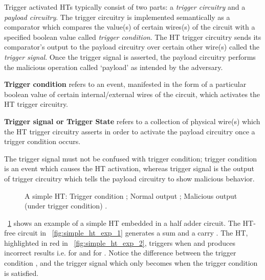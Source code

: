 \documentclass[10pt,journal,compsoc]{IEEEtran}
\begin{document}
Trigger activated HTs typically consist of two parts: a \textit{trigger circuitry} and a \textit{payload circuitry}.
The trigger circuitry is implemented semantically as a comparator which compares the value(s) of certain wires(s) of the circuit with a specified boolean value called \textit{trigger condition}.
The HT trigger circuitry sends its comparator's output to the payload circuitry over certain other wire(s) called the \textit{trigger signal}.
Once the trigger signal is asserted, the payload circuitry performs the malicious operation called `payload' as intended by the adversary.

\begin{definition}
\textbf{Trigger condition} refers to an event, manifested in the form of a particular boolean value of certain internal/external wires of the circuit, which activates the HT trigger circuitry.
\end{definition}
\begin{definition}
\textbf{Trigger signal or Trigger State} refers to a collection of physical wire(s) which the HT trigger circuitry asserts in order to activate the payload circuitry once a trigger condition occurs.
\end{definition}

The trigger signal must not be confused with trigger condition; trigger condition is an event which causes the HT activation, whereas trigger signal is the output of trigger circuitry which tells the payload circuitry to show malicious behavior.

\begin{figure}[!t]
\centering
{}
\hfil
{}
\caption{A simple HT: Trigger condition ; Normal output ; Malicious output (under trigger condition) .}
\label{fig:simple_ht_example}
\end{figure}

\figurename~\ref{fig:simple_ht_example} shows an example of a simple HT embedded in a half adder circuit.
The HT-free circuit in \figurename~\ref{fig:simple_ht_exp_1} generates a sum  and a carry . 
The HT, highlighted in red in \figurename~\ref{fig:simple_ht_exp_2}, triggers when  and produces incorrect results i.e.  for  and  for .
Notice the difference between the trigger condition , and the trigger signal  which only becomes  when the trigger condition is satisfied.
\end{document}
